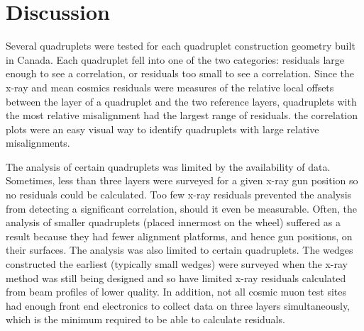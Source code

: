 \section{Discussion}


Several quadruplets were tested for each quadruplet construction geometry built in Canada. Each quadruplet fell into one of the two categories: residuals large enough to see a correlation, or residuals too small to see a correlation. Since the x-ray and mean cosmics residuals were measures of the relative local offsets between the layer of a quadruplet and the two reference layers, quadruplets with the most relative misalignment had the largest range of residuals. the correlation plots were an easy visual way to identify quadruplets with large relative misalignments.

The analysis of certain quadruplets was limited by the availability of data. Sometimes, less than three layers were surveyed for a given x-ray gun position so no residuals could be calculated. Too few x-ray residuals prevented the analysis from detecting a significant correlation, should it even be measurable. Often, the analysis of smaller quadruplets (placed innermost on the wheel) suffered as a result because they had fewer alignment platforms, and hence gun positions, on their surfaces. The analysis was also limited to certain quadruplets. The wedges constructed the earliest (typically small wedges) were surveyed when the x-ray method was still being designed and so have limited x-ray residuals calculated from beam profiles of lower quality. In addition, not all cosmic muon test sites had enough front end electronics to collect data on three layers simultaneously, which is the minimum required to be able to calculate residuals.

